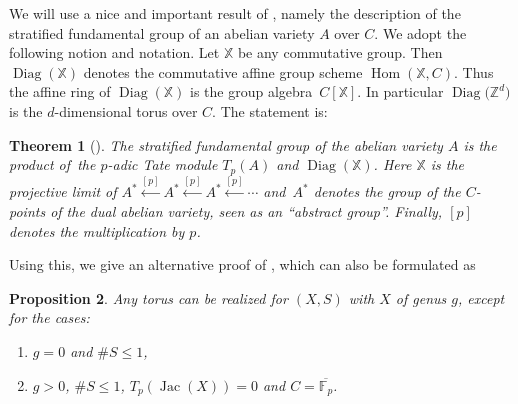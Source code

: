 \documentclass[pdftex]{sigma}
\numberwithin{equation}{section}
\newtheorem{Theorem}{Theorem}[section]
\newtheorem{Proposition}[Theorem]{Proposition}
\begin{document}
We will use a nice and important result of \cite[Theorem~21]{Sa}, namely the description of the stratified fundamental group of an abelian variety $A$ over $C$. We adopt the following notion and notation. Let $\mathbb{X}$ be any commutative group. Then $\operatorname{Diag}(\mathbb{X})$ denotes the commutative affine group scheme
$\operatorname{Hom}(\mathbb{X},C)$. Thus the affine ring of $\operatorname{Diag}(\mathbb{X})$ is the group algebra~$C[\mathbb{X}]$. In particular $\operatorname{Diag}\big(\mathbb{Z}^d\big)$ is the $d$-dimensional torus over $C$. The statement is:

\begin{Theorem}[\cite{Sa}]\label{2.4} The stratified fundamental group of the abelian variety $A$ is the product of~the $p$-adic Tate module $T_p(A)$ and $\operatorname{Diag}(\mathbb{X})$. Here $\mathbb{X}$ is the projective limit of $A^*\overset{[p]}{\leftarrow}A^*\overset{[p]}{\leftarrow}A^*\overset{[p]}{\leftarrow}\cdots$ and~$A^*$ denotes the group of the $C$-points of the dual abelian variety, seen as an ``abstract group''. Finally, $[p]$ denotes the multiplication by $p$.\end{Theorem}

Using this, we give an alternative proof of \cite[Theorem~7.1(3)]{Ma-vdP1}, which can also be formulated as

\begin{Proposition}\label{2.5} \samepage Any torus can be realized for $(X,S)$ with $X$ of genus $g$, except for the cases:
\begin{enumerate}\itemsep=0pt
\item[$(a)$] $g=0$ and $\# S \leq 1$,
\item[$(b)$] $g>0$, $\# S\leq 1$, $T_p(\operatorname{Jac}(X))=0$ and $C=\overline{\mathbb{F}_p}$.
\end{enumerate}
 \end{Proposition}
\end{document}
